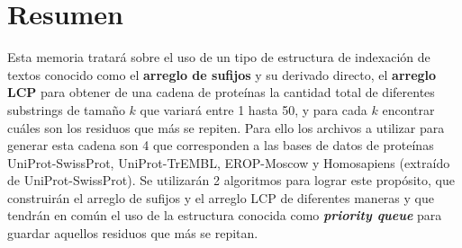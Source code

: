 \chapter*{Resumen}

Esta memoria tratará sobre el uso de un tipo de estructura de indexación de textos conocido como el \textbf{arreglo de sufijos} y su derivado directo, el \textbf{arreglo LCP} para obtener de una cadena de proteínas la cantidad total de diferentes substrings de tamaño $k$ que variará entre 1 hasta 50, y para cada $k$ encontrar cuáles son los residuos que más se repiten. Para ello los archivos a utilizar para generar esta cadena son 4 que corresponden a las bases de datos de proteínas UniProt-SwissProt, UniProt-TrEMBL, EROP-Moscow y Homosapiens (extraído de UniProt-SwissProt). Se utilizarán 2 algoritmos para lograr este propósito, que construirán el arreglo de sufijos y el arreglo LCP de diferentes maneras y que tendrán en común el uso de la estructura conocida como \textbf{\textit{priority queue}} para guardar aquellos residuos que más se repitan.

